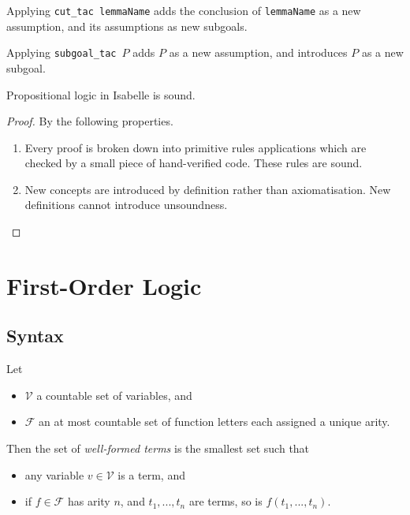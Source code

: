 \documentclass{article}
\begin{document}
\begin{definition}
	Applying \texttt{cut\_tac lemmaName} adds the conclusion of \texttt{lemmaName} as a
	new assumption, and its assumptions as new subgoals.
\end{definition}

\begin{definition}
	Applying \texttt{subgoal\_tac $P$} adds $P$ as a new assumption, and introduces $P$
	as a new subgoal.
\end{definition}

\begin{theorem}
	Propositional logic in Isabelle is sound.
\end{theorem}
\begin{proof}
	By the following properties.
	\begin{enumerate}
		\item Every proof is broken down into primitive rules applications which are checked
		      by a small piece of hand-verified code. These rules are sound.
		\item New concepts are introduced by definition rather than axiomatisation. New
		      definitions cannot introduce unsoundness.
	\end{enumerate}
\end{proof}

\section{First-Order Logic}

\subsection{Syntax}

\begin{definition}
	Let
	\begin{itemize}
		\item $\mathcal{V}$ a countable set of variables, and
		\item $\mathcal{F}$ an at most countable set of function letters each assigned a unique arity.
	\end{itemize}
	Then the set of \emph{well-formed terms} is the smallest set such that
	\begin{itemize}
		\item any variable $v\in \mathcal{V}$ is a term, and
		\item if $f\in \mathcal{F}$ has arity $n$, and $t_1,...,t_n$ are terms, so is $f(t_1, ..., t_n)$.
	\end{itemize}
\end{definition}
\end{document}
